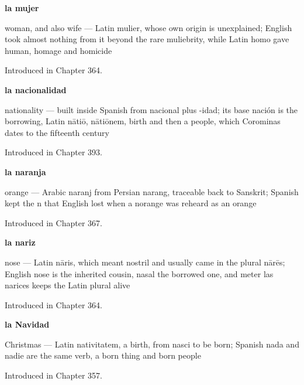 \noindent\begin{minipage}[t]{\linewidth}
\raggedright
\textbf{la mujer}\par
\small woman, and also wife — Latin mulier, whose own origin is unexplained; English took almost nothing from it beyond the rare muliebrity, while Latin homo gave human, homage and homicide\par
\footnotesize Introduced in Chapter 364.
\end{minipage}\par\medskip

\noindent\begin{minipage}[t]{\linewidth}
\raggedright
\textbf{la nacionalidad}\par
\small nationality — built inside Spanish from nacional plus -idad; its base nación is the borrowing, Latin nātiō, nātiōnem, birth and then a people, which Corominas dates to the fifteenth century\par
\footnotesize Introduced in Chapter 393.
\end{minipage}\par\medskip

\noindent\begin{minipage}[t]{\linewidth}
\raggedright
\textbf{la naranja}\par
\small orange — Arabic naranj from Persian narang, traceable back to Sanskrit; Spanish kept the n that English lost when a norange was reheard as an orange\par
\footnotesize Introduced in Chapter 367.
\end{minipage}\par\medskip

\noindent\begin{minipage}[t]{\linewidth}
\raggedright
\textbf{la nariz}\par
\small nose — Latin nāris, which meant nostril and usually came in the plural nārēs; English nose is the inherited cousin, nasal the borrowed one, and meter las narices keeps the Latin plural alive\par
\footnotesize Introduced in Chapter 364.
\end{minipage}\par\medskip

\noindent\begin{minipage}[t]{\linewidth}
\raggedright
\textbf{la Navidad}\par
\small Christmas — Latin nativitatem, a birth, from nasci to be born; Spanish nada and nadie are the same verb, a born thing and born people\par
\footnotesize Introduced in Chapter 357.
\end{minipage}\par\medskip

